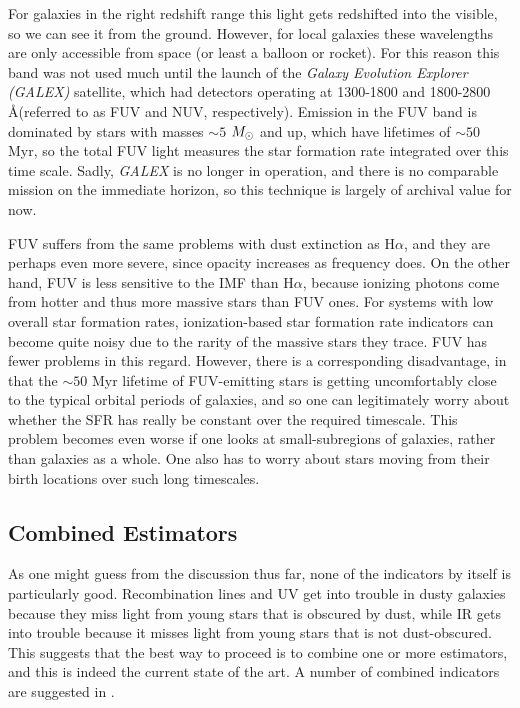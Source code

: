 For galaxies in the right redshift range this light gets redshifted into the visible, so we can see it from the ground. However, for local galaxies these wavelengths are only accessible from space (or least a balloon or rocket). For this reason this band was not used much until the launch of the \textit{Galaxy Evolution Explorer (GALEX)} satellite, which had detectors operating at 1300-1800 and 1800-2800 \AA (referred to as FUV and NUV, respectively). Emission in the FUV band is dominated by stars with masses $\sim 5$ $M_{\odot}$ and up, which have lifetimes of $\sim 50$ Myr, so the total FUV light measures the star formation rate integrated over this time scale. Sadly, \textit{GALEX} is no longer in operation, and there is no comparable mission on the immediate horizon, so this technique is largely of archival value for now.

FUV suffers from the same problems with dust extinction as H$\alpha$, and they are perhaps even more severe, since opacity increases as frequency does. On the other hand, FUV is less sensitive to the IMF than H$\alpha$, because ionizing photons come from hotter and thus more massive stars than FUV ones. For systems with low overall star formation rates, ionization-based star formation rate indicators can become quite noisy due to the rarity of the massive stars they trace. FUV has fewer problems in this regard. However, there is a corresponding disadvantage, in that the $\sim 50$ Myr lifetime of FUV-emitting stars is getting uncomfortably close to the typical orbital periods of galaxies, and so one can legitimately worry about whether the SFR has really be constant over the required timescale. This problem becomes even worse if one looks at small-subregions of galaxies, rather than galaxies as a whole. One also has to worry about stars moving from their birth locations over such long timescales.


\subsection{Combined Estimators}

As one might guess from the discussion thus far, none of the indicators by itself is particularly good. Recombination lines and UV get into trouble in dusty galaxies because they miss light from young stars that is obscured by dust, while IR gets into trouble because it misses light from young stars that is not dust-obscured. This suggests that the best way to proceed is to combine one or more estimators, and this is indeed the current state of the art. A number of combined indicators are suggested in \citet{kennicutt12a}.



